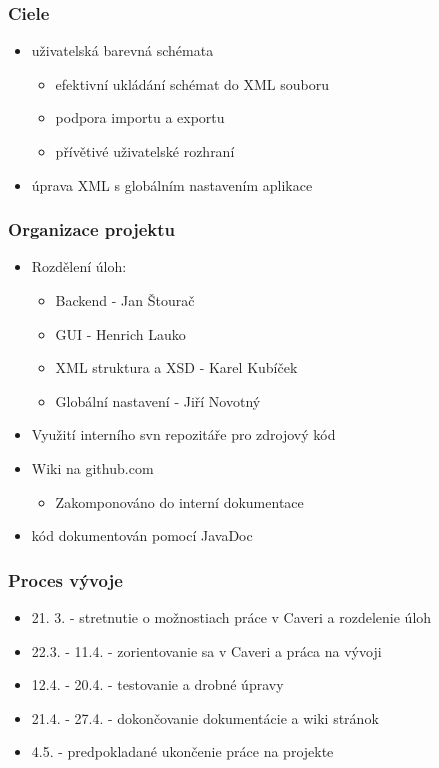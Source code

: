 \documentclass[slovak]{beamer}
\begin{document}
\begin{frame}
\frametitle{Ciele}
	\begin{itemize}
		\item uživatelská barevná schémata
		\begin{itemize}
			\item efektivní ukládání schémat do XML souboru
			\item podpora importu a exportu
			\item přívětivé uživatelské rozhraní
		\end{itemize}
		\item úprava XML s globálním nastavením aplikace
	\end{itemize}
\end{frame}

\begin{frame}
\frametitle{Organizace projektu}
	\begin{itemize}
		\item Rozdělení úloh:
		\begin{itemize}
			\item Backend - Jan Štourač
			\item GUI - Henrich Lauko
			\item XML struktura a XSD - Karel Kubíček
			\item Globální nastavení - Jiří Novotný
		\end{itemize}
		\item Využití interního svn repozitáře pro zdrojový kód
		\item Wiki na github.com
		\begin{itemize}
			\item Zakomponováno do interní dokumentace
		\end{itemize}
		\item kód dokumentován pomocí JavaDoc
	\end{itemize}
\end{frame}

\begin{frame}
\frametitle{Proces vývoje}
	\begin{itemize}
		\item 21. 3. - stretnutie o možnostiach práce v Caveri a rozdelenie úloh
		\item 22.3. - 11.4. - zorientovanie sa v Caveri a práca na vývoji
		\item 12.4. - 20.4. - testovanie a drobné úpravy
		\item 21.4. - 27.4. - dokončovanie dokumentácie a wiki stránok
		\item 4.5. - predpokladané ukončenie práce na projekte
	\end{itemize}
\end{frame}
\end{document}
